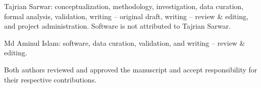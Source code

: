 Tajrian Sarwar: conceptualization, methodology, investigation, data curation, formal analysis, validation, writing -- original draft, writing -- review \& editing, and project administration. Software is not attributed to Tajrian Sarwar.

Md Aminul Islam: software, data curation, validation, and writing -- review \& editing.

Both authors reviewed and approved the manuscript and accept responsibility for their respective contributions.